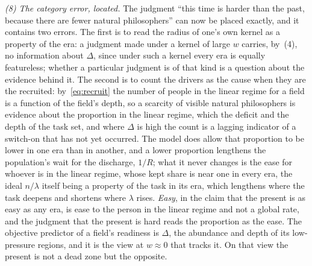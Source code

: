 \documentclass{article}
\begin{document}
\emph{(8) The category error, located.} The judgment ``this time is harder than the past, because there are fewer natural philosophers'' can now be placed exactly, and it contains two errors. The first is to read the radius of one's own kernel as a property of the era: a judgment made under a kernel of large $w$ carries, by~(4), no information about $\Delta$, since under such a kernel every era is equally featureless; whether a particular judgment is of that kind is a question about the evidence behind it. The second is to count the drivers as the cause when they are the recruited: by~\eqref{eq:recruit} the number of people in the linear regime for a field is a function of the field's depth, so a scarcity of visible natural philosophers is evidence about the proportion in the linear regime, which the deficit and the depth of the task set, and where $\Delta$ is high the count is a lagging indicator of a switch-on that has not yet occurred. The model does allow that proportion to be lower in one era than in another, and a lower proportion lengthens the population's wait for the discharge, $1/R$; what it never changes is the ease for whoever is in the linear regime, whose kept share is near one in every era, the ideal $n/\lambda$ itself being a property of the task in its era, which lengthens where the task deepens and shortens where $\lambda$ rises. \emph{Easy}, in the claim that the present is as easy as any era, is ease to the person in the linear regime and not a global rate, and the judgment that the present is hard reads the proportion as the ease. The objective predictor of a field's readiness is $\Delta$, the abundance and depth of its low-pressure regions, and it is the view at $w \approx 0$ that tracks it. On that view the present is not a dead zone but the opposite.
\end{document}
